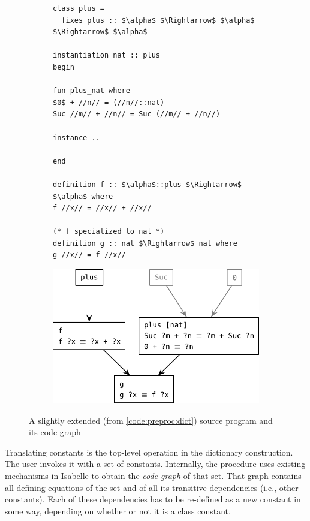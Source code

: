 \begin{figure}[t]
  \begin{subfigure}{.49\linewidth}
    \begin{lstlisting}[language=Isabelle]
class plus =
  fixes plus :: $\alpha$ $\Rightarrow$ $\alpha$ $\Rightarrow$ $\alpha$

instantiation nat :: plus
begin

fun plus_nat where
$0$ + //n// = (//n//::nat)
Suc //m// + //n// = Suc (//m// + //n//)

instance ..

end

definition f :: $\alpha$::plus $\Rightarrow$ $\alpha$ where
f //x// = //x// + //x//

(* f specialized to nat *)
definition g :: nat $\Rightarrow$ nat where
g //x// = f //x//
    \end{lstlisting}
  \end{subfigure}
  \begin{subfigure}{.49\linewidth}
    \includegraphics[width=\linewidth]{img/code-deps.pdf}
  \end{subfigure}
  \caption[A slightly extended source program and its code graph]{A slightly extended (from \cref{code:preproc:dict}) source program and its code graph}
  \label{fig:preproc:graph}
\end{figure}

Translating constants is the top-level operation in the dictionary construction.
The user invokes it with a set of constants.
Internally, the procedure uses existing mechanisms in Isabelle to obtain the \emph{code graph} of that set.
That graph contains all defining equations of the set and of all its transitive dependencies (i.e., other constants).
Each of these dependencies has to be re-defined as a new constant in some way, depending on whether or not it is a class constant.

